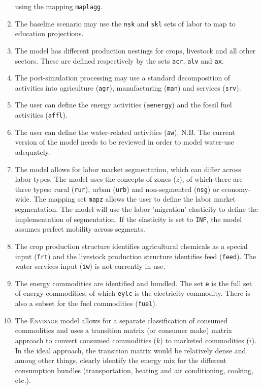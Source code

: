 \begin{enumerate}
using the mapping \texttt{maplagg}.
\item The baseline scenario may use the \texttt{nsk} and \texttt{skl} sets of
labor to map to education projections.
\item The model has different production nestings for crops,
livestock and all other sectors. These are defined respectively
by the sets \texttt{acr}, \texttt{alv} and \texttt{ax}.
\item The post-simulation processing may use a standard decomposition
of activities into agriculture (\texttt{agr}), manufacturing (\texttt{man})
and services (\texttt{srv}).
\item The user can define the energy activities (\texttt{aenergy}) and the fossil fuel
activities (\texttt{affl}).
\item The user can define the water-related activities (\texttt{aw}). N.B. The
current version of the model needs to be reviewed in order to model water-use
adequately.
\item The model allows for labor market segmentation, which can differ
across labor types. The model uses the concepts of zones ($z$), of
which there are three types: rural (\texttt{rur}), urban (\texttt{urb})
and non-segmented (\texttt{nsg}) or economy-wide.
The mapping set \texttt{mapz} allows the user to define the labor market
segmentation. The model will use the labor 'migration' elasticity to define
the implementation of segmentation. If the elasticity is set to \texttt{INF}, the
model assumes perfect mobility across segments.
\item The crop production structure identifies agricultural chemicals
as a special input (\texttt{frt}) and the livestock production
structure identifies feed (\texttt{feed}). The water services
input (\texttt{iw}) is not currently in use.
\item The energy commodities are identified and bundled. The set
\texttt{e} is the full set of energy commodities, of which
\texttt{eylc} is the electricity commodity. There is also
a subset for the fuel commodities (\texttt{fuel}).
\item The \textsc{Envisage} model allows for a separate classification
of consumed commodities and uses a transition matrix (or consumer make)
matrix approach to convert consumed commodities ($k$) to marketed commodities ($i$).
In the ideal approach, the transition matrix would be relatively dense and
among other things, clearly identify the energy mix for the different
consumption bundles (transportation, heating and air conditioning, cooking, etc.).

\end{enumerate}

